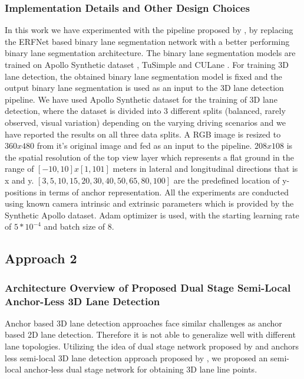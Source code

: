             \subsubsection{Implementation Details and Other Design Choices}
            In this work we have experimented with the pipeline proposed by \cite{Guo_2018_ECCV}, by replacing the ERFNet\cite{8063438} based binary lane segmentation network with a better performing binary lane segmentation architecture. The binary lane segmentation models are trained on Apollo Synthetic dataset \cite{guo2020gen}, TuSimple \cite{Tusimple} and CULane \cite{pan2018SCNN}. For training 3D lane detection, the obtained binary lane segmentation model is fixed and the output binary lane segmentation is used as an input to the 3D lane detection pipeline. We have used Apollo Synthetic dataset \cite{Guo_2018_ECCV} for the training of 3D lane detection, where the dataset is divided into 3 different splits (balanced, rarely observed, visual variation) depending on the varying driving scenarios and we have reported the results on all three data splits. A RGB image is resized to $360 x 480$ from it's original image and fed as an input to the pipeline. $208 x 108$ is the spatial resolution of the top view layer which represents a flat ground in the range of $[-10, 10] x [1 , 101]$ meters in lateral and longitudinal directions that is x and y. $[3, 5, 10, 15, 20, 30, 40, 50, 65, 80, 100]$ are the predefined location of y-positions in terms of anchor representation. All the experiments are conducted using known camera intrinsic and extrinsic parameters which is provided by the Synthetic Apollo dataset. Adam optimizer is used, with the starting learning rate of $5*10^{-4}$ and batch size of 8. 
            
        \subsection{Approach 2}
        
        \subsubsection{Architecture Overview of Proposed Dual Stage Semi-Local Anchor-Less 3D Lane Detection}
        
        Anchor based 3D lane detection approaches face similar challenges as anchor based 2D lane detection. Therefore it is not able to generalize well with different lane topologies. Utilizing the idea of dual stage network proposed by \cite{guo2020gen} and anchors less semi-local 3D lane detection approach proposed by \cite{DBLP:journals/corr/abs-2011-01535}, we proposed an semi-local anchor-less dual stage network for obtaining 3D lane line points.
        
